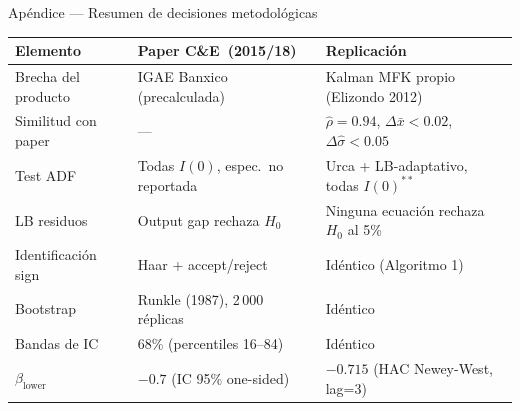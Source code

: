 \documentclass[aspectratio=169, 10pt]{beamer}
\newcommand{\CE}{C\&E~(2015/18)}
\begin{document}
\begin{frame}{Apéndice — Resumen de decisiones metodológicas}

  \begin{table}
    \centering\small
    \begin{tabular}{p{3.0cm}p{5.4cm}p{4.8cm}}
      \toprule
      \textbf{Elemento} & \textbf{Paper \CE} & \textbf{Replicación} \\
      \midrule
      Brecha del producto
        & IGAE Banxico (precalculada)
        & Kalman MFK propio (Elizondo 2012) \\
      Similitud con paper
        & ---
        & $\hat{\rho} = 0.94$, $\Delta\bar{x}<0.02$, $\Delta\hat{\sigma}<0.05$ \\
      Test ADF
        & Todas $I(0)$, espec.\ no reportada
        & Urca + LB-adaptativo, todas $I(0)^{**}$ \\
      LB residuos
        & Output gap rechaza $H_0$
        & Ninguna ecuación rechaza $H_0$ al 5\% \\
      Identificación sign
        & Haar + accept/reject
        & Idéntico (Algoritmo 1) \\
      Bootstrap
        & Runkle (1987), 2\,000 réplicas
        & Idéntico \\
      Bandas de IC
        & 68\% (percentiles 16–84)
        & Idéntico \\
      $\beta_{\text{lower}}$
        & $-0.7$ (IC 95\% one-sided)
        & $-0.715$ (HAC Newey-West, lag=3) \\
      \bottomrule
    \end{tabular}
  \end{table}

\end{frame}

\end{document}

